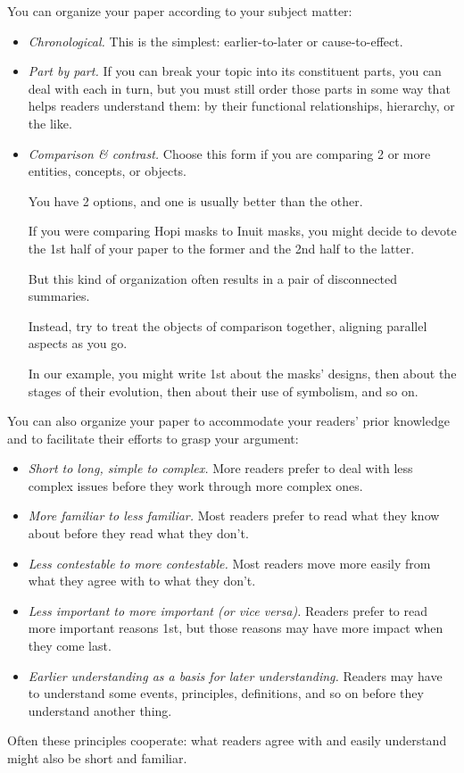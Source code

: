 \documentclass[oneside]{book}
\numberwithin{equation}{section}
\begin{document}
%
You can organize your paper according to your subject matter:
\begin{itemize}
    \item \textit{Chronological.} This is the simplest: earlier-to-later or cause-to-effect.
    \item \textit{Part by part.} If you can break your topic into its constituent parts, you can deal with each in turn, but you must still order those parts in some way that helps readers understand them: by their functional relationships, hierarchy, or the like.
    \item \textit{Comparison \& contrast.} Choose this form if you are comparing 2 or more entities, concepts, or objects.
    
    You have 2 options, and one is usually better than the other.
    
    If you were comparing Hopi masks to Inuit masks, you might decide to devote the 1st half of your paper to the former and the 2nd half to the latter.
    
    But this kind of organization often results in a pair of disconnected summaries.
    
    Instead, try to treat the objects of comparison together, aligning parallel aspects as you go.
    
    In our example, you might write 1st about the masks' designs, then about the stages of their evolution, then about their use of symbolism, and so on.
\end{itemize}
You can also organize your paper to accommodate your readers' prior knowledge and to facilitate their efforts to grasp your argument:
\begin{itemize}
    \item \textit{Short to long, simple to complex.} More readers prefer to deal with less complex issues before they work through more complex ones.
    \item \textit{More familiar to less familiar.} Most readers prefer to read what they know about before they read what they don't.
    \item \textit{Less contestable to more contestable.} Most readers move more easily from what they agree with to what they don't.
    \item \textit{Less important to more important (or vice versa).} Readers prefer to read more important reasons 1st, but those reasons may have more impact when they come last.
    \item \textit{Earlier understanding as a basis for later understanding.} Readers may have to understand some events, principles, definitions, and so on before they understand another thing.
\end{itemize}
Often these principles cooperate: what readers agree with and easily understand might also be short and familiar.
\end{document}
